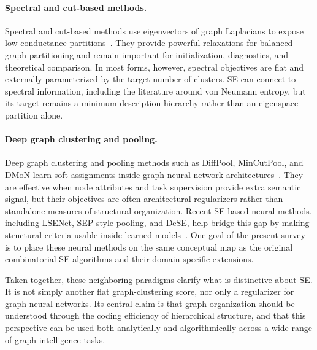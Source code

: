 \paragraph{Spectral and cut-based methods.}
Spectral and cut-based methods use eigenvectors of graph Laplacians to expose
low-conductance partitions~\cite{shi2000normalized,ng2002spectral}.
They provide powerful relaxations for balanced graph partitioning and remain
important for initialization, diagnostics, and theoretical comparison.
In most forms, however, spectral objectives are flat and externally
parameterized by the target number of clusters.
SE can connect to spectral information, including the literature around
von Neumann entropy, but its target remains a minimum-description hierarchy
rather than an eigenspace partition alone.

\paragraph{Deep graph clustering and pooling.}
Deep graph clustering and pooling methods such as DiffPool, MinCutPool, and
DMoN learn soft assignments inside graph neural network architectures~\cite{ying2018diffpool,bianchi2020mincutpool,tsitsulin2020dmon}.
They are effective when node attributes and task supervision provide extra
semantic signal, but their objectives are often architectural regularizers
rather than standalone measures of structural organization.
Recent SE-based neural methods, including LSENet, SEP-style pooling, and
DeSE, help bridge this gap by making structural criteria usable inside learned
models~\cite{wu2022pooling,sun2024lsenet,zhang2025dese}.
One goal of the present survey is to place these neural methods on the same
conceptual map as the original combinatorial SE algorithms and their
domain-specific extensions.

Taken together, these neighboring paradigms clarify what is distinctive about
SE.
It is not simply another flat graph-clustering score, nor only a regularizer
for graph neural networks.
Its central claim is that graph organization should be understood through the
coding efficiency of hierarchical structure, and that this perspective can be
used both analytically and algorithmically across a wide range of graph
intelligence tasks.

